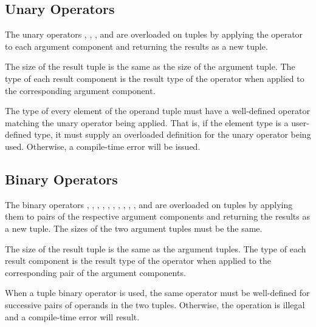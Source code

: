 \subsection{Unary Operators}
\label{Tuple_Unary_Operators}

The unary operators \chpl{\+}, \chpl{\-}, \chpl{\~}, and \chpl{\!} are
overloaded on tuples by applying the operator to each argument component
and returning the results as a new tuple.

The size of the result tuple is the same as the size of the
argument tuple. The type of each result component is the result
type of the operator when applied to the corresponding argument component.

The type of every element of the operand tuple must have a
well-defined operator matching the unary operator being applied.  That
is, if the element type is a user-defined type, it must supply an
overloaded definition for the unary operator being used.  Otherwise, a
compile-time error will be issued.

\subsection{Binary Operators}
\label{Tuple_Binary_Operators}

The binary operators \chpl{\+}, \chpl{\-}, \chpl{\*}, \chpl{\/}, \chpl{\%},
\chpl{\*\*}, \chpl{\&}, \chpl{\|}, \chpl{\^}, \chpl{\<\<}, and \chpl{\>\>}
are overloaded on tuples by applying them to pairs of the respective
argument components and returning the results as a new tuple.
The sizes of the two argument tuples must be the same.

The size of the result tuple is the same as the argument tuples.  The
type of each result component is the result type of the operator when
applied to the corresponding pair of the argument components.

When a tuple binary operator is used, the same operator must be
well-defined for successive pairs of operands in the two tuples.
Otherwise, the operation is illegal and a compile-time error will
result.


